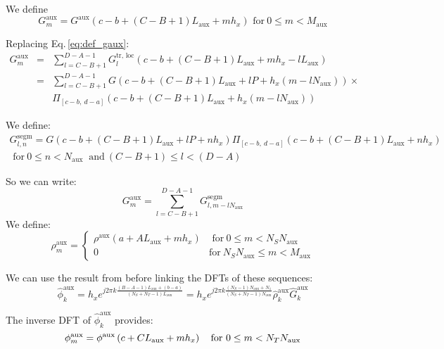 We define
\begin{equation}
G^\text{aux}_m = G^\text{aux}\left(c-b +(C-B+1)L_\text{aux} + mh_x\right) 
\text{ for}~0 \leq m <M_\text{aux}
\end{equation}

Replacing Eq.\,\ref{eq:def_gaux}: 
\begin{eqnarray}
G^\text{aux}_m 
&=&
\sum_{l=C-B+1}^{D-A-1}
G^\text{tr, loc}_{l}(c-b +(C-B+1)L_\text{aux} + mh_x -l L_\text{aux})\\
&=&
\sum_{l=C-B+1}^{D-A-1}
G(c-b  +(C-B+1)L_\text{aux} +lP + h_x (m  -l N_\text{aux}) ) \times\\
&&
\Pi_{[c-b,~d-a]}(c-b +(C-B+1)L_\text{aux} + h_x(m -l N_\text{aux}))
\end{eqnarray}

We define:
\begin{multline}
G^\text{segm}_{l,n} =  G(c-b  +(C-B+1)L_\text{aux} +lP + n h_x ) 
\Pi_{[c-b,~d-a]}(c-b +(C-B+1)L_\text{aux} + n h_x)\\
\text{ for}~0 \leq n <N_\text{aux}
~\text{ and}~(C-B+1) \leq l < (D-A)
\end{multline}

So we can write:
\begin{equation}
G^\text{aux}_m = \sum_{l=C-B+1}^{D-A-1}
G^\text{segm}_{l,m-lN_\text{aux}}
\end{equation}
We define:
\begin{equation}
\rho^\text{aux}_m = 
 \begin{cases}
\rho^\text{aux}\left(a +AL_\text{aux} + mh_x\right) 
&\text{ for}~0 \leq m <N_S N_\text{aux}\\
 0 & \text{for}~N_S N_\text{aux} \leq m < M_\text{aux}
\end{cases}
\end{equation}

We can use the result from before linking the DFTs of these sequences:
\begin{equation}
\hat{\phi}^\text{aux}_k  = 
h_x 
e^{j2\pi k \frac{(B-A-1)L_\text{aux} + (b-a)}{(N_S + N_T-1)L_\text{aux}}}
=
h_x 
e^{j2\pi k \frac{(N_S-1)N_\text{aux} + N_1}{(N_S + N_T -1)N_\text{aux}}}
\hat{\rho}^\text{aux}_k \hat{G}^\text{aux}_k
\end{equation}

The inverse DFT of $\hat{\phi}^\text{aux}_k$ provides:
\begin{equation}
\phi^\text{aux}_m = 
\phi^\text{aux}\left(c +CL_\text{aux} + mh_x\right) 
\text{~~ for}~0 \leq m <N_T N_\text{aux}\\
\end{equation}
